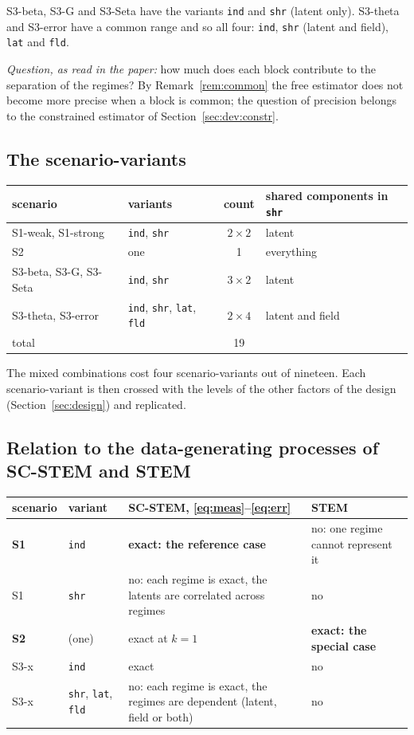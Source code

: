 \documentclass[11pt]{article}
\begin{document}
S3-beta, S3-G and S3-Seta have the variants \texttt{ind} and \texttt{shr} (latent only). S3-theta and S3-error have a common range and so all four: \texttt{ind}, \texttt{shr} (latent and field), \texttt{lat} and \texttt{fld}.

\emph{Question, as read in the paper:} how much does each block contribute to the separation of the regimes? By Remark~\ref{rem:common} the free estimator does not become more precise when a block is common; the question of precision belongs to the constrained estimator of Section~\ref{sec:dev:constr}.

\subsection{The scenario-variants}

\begin{center}
\begin{tabular}{llcl}
\toprule
scenario & variants & count & shared components in \texttt{shr} \\
\midrule
S1-weak, S1-strong & \texttt{ind}, \texttt{shr} & $2 \times 2$ & latent \\
S2 & one & 1 & everything \\
S3-beta, S3-G, S3-Seta & \texttt{ind}, \texttt{shr} & $3 \times 2$ & latent \\
S3-theta, S3-error & \texttt{ind}, \texttt{shr}, \texttt{lat}, \texttt{fld} & $2 \times 4$ & latent and field \\
\midrule
total & & 19 & \\
\bottomrule
\end{tabular}
\end{center}
The mixed combinations cost four scenario-variants out of nineteen. Each scenario-variant is then crossed with the levels of the other factors of the design (Section~\ref{sec:design}) and replicated.

\subsection{Relation to the data-generating processes of SC-STEM and STEM}

\begin{center}
\begin{tabular}{ll>{\raggedright\arraybackslash}p{5.6cm}>{\raggedright\arraybackslash}p{3.9cm}}
\toprule
scenario & variant & SC-STEM, \eqref{eq:meas}--\eqref{eq:err} & STEM \\
\midrule
\textbf{S1} & \texttt{ind} & \textbf{exact: the reference case} & no: one regime cannot represent it \\
S1 & \texttt{shr} & no: each regime is exact, the latents are correlated across regimes & no \\
\textbf{S2} & (one) & exact at $k = 1$ & \textbf{exact: the special case} \\
S3-x & \texttt{ind} & exact & no \\
S3-x & \texttt{shr}, \texttt{lat}, \texttt{fld} & no: each regime is exact, the regimes are dependent (latent, field or both) & no \\
\bottomrule
\end{tabular}
\end{center}
\end{document}
